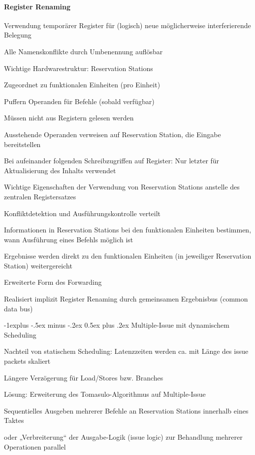 \documentclass[a4paper]{article}
\makeatletter
\renewcommand{\subsection}{\@startsection{subsection}{2}{0mm}%
                                {-1explus -.5ex minus -.2ex}%
                                {0.5ex plus .2ex}%
                                {\normalfont\normalsize\bfseries}}
\makeatother
\begin{document}
\begin{multicols}{3}
  \paragraph{Register Renaming}
  \begin{itemize*}
    \item Verwendung temporärer Register für (logisch) neue möglicherweise interferierende Belegung
    \item Alle Namenskonflikte durch Umbenennung auflösbar
    \item Wichtige Hardwarestruktur: Reservation Stations
    \item Zugeordnet zu funktionalen Einheiten (pro Einheit)
    \item Puffern Operanden für Befehle (sobald verfügbar)
    \item Müssen nicht aus Registern gelesen werden
    \item Ausstehende Operanden verweisen auf Reservation Station, die Eingabe bereitstellen
    \item Bei aufeinander folgenden Schreibzugriffen auf Register: Nur letzter für Aktualisierung des Inhalts verwendet
    \item Wichtige Eigenschaften der Verwendung von Reservation Stations anstelle des zentralen Registersatzes
    \item Konfliktdetektion und Ausführungskontrolle verteilt
    \item Informationen in Reservation Stations bei den funktionalen Einheiten bestimmen, wann Ausführung eines Befehls möglich ist
    \item Ergebnisse werden direkt zu den funktionalen Einheiten (in jeweiliger Reservation Station) weitergereicht
    \item Erweiterte Form des Forwarding
    \item Realisiert implizit Register Renaming durch gemeinsamen Ergebnisbus (common data bus)
  \end{itemize*}
  
  \subsection{Multiple-Issue mit dynamischem Scheduling}
  \begin{itemize*}
    \item Nachteil von statischem Scheduling: Latenzzeiten werden ca. mit Länge des issue packets skaliert
    \item Längere Verzögerung für Load/Stores bzw. Branches
    \item Lösung: Erweiterung des Tomasulo-Algorithmus auf Multiple-Issue
    \item Sequentielles Ausgeben mehrerer Befehle an Reservation Stations innerhalb eines Taktes
    \item oder „Verbreiterung“ der Ausgabe-Logik (issue logic) zur Behandlung mehrerer Operationen parallel
  \end{itemize*}
  

\end{multicols}
\end{document}

